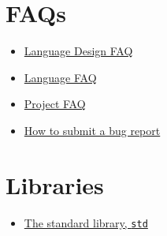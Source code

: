 \documentclass[]{article}
\begin{document}
\section{FAQs}\label{faqs}

\begin{itemize}
\itemsep1pt\parskip0pt
\item
  \href{complement-design-faq.html}{Language Design FAQ}
\item
  \href{complement-lang-faq.html}{Language FAQ}
\item
  \href{complement-project-faq.html}{Project FAQ}
\item
  \href{complement-bugreport.html}{How to submit a bug report}
\end{itemize}

\section{Libraries}\label{libraries}

\begin{itemize}
\itemsep1pt\parskip0pt
\item
  \href{std/index.html}{The standard library, \texttt{std}}
\end{itemize}
\end{document}
